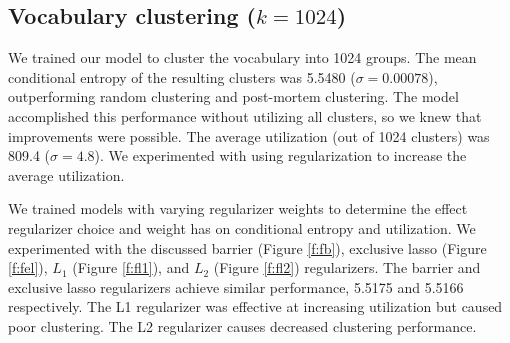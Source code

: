 \documentclass[11pt,letterpaper]{article}
\begin{document}
\subsection{Vocabulary clustering ($k=1024$)}

We trained our model to cluster the vocabulary into 1024 groups. The mean conditional entropy of the resulting clusters was 5.5480 ($\sigma=0.00078$), outperforming random clustering and post-mortem clustering. The model accomplished this performance without utilizing all clusters, so we knew that improvements were possible. The average utilization (out of 1024 clusters) was 809.4 ($\sigma=4.8$). We experimented with using regularization to increase the average utilization.

We trained models with varying regularizer weights to determine the effect regularizer choice and weight has on conditional entropy and utilization. We experimented with the discussed barrier (Figure \ref{f:fb}), exclusive lasso (Figure \ref{f:fel}), $L_1$ (Figure \ref{f:fl1}), and $L_2$ (Figure \ref{f:fl2}) regularizers. The barrier and exclusive lasso regularizers achieve similar performance, 5.5175 and 5.5166 respectively. The L1 regularizer was effective at increasing utilization but caused poor clustering. The L2 regularizer causes decreased clustering performance.
\end{document}
